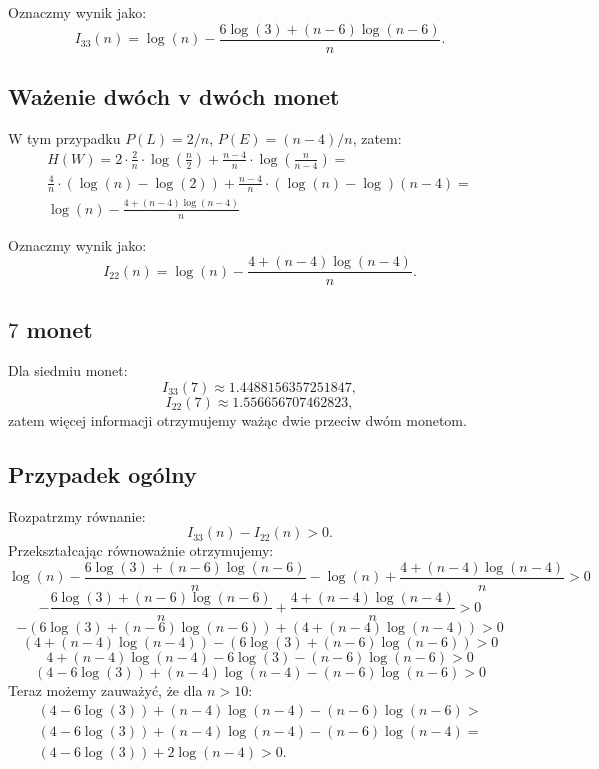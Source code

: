 Oznaczmy wynik jako:
$$
	I_{33}(n) = \log(n) - \frac{6\log(3) + (n-6)\log(n-6)}{n}.
$$

\subsection*{Ważenie dwóch v dwóch monet}

W tym przypadku $P(L) = 2/n$, $P(E) = (n-4)/n$, zatem:
\begin{align}
	H(W) = 2 \cdot \frac{2}{n} \cdot \log(\frac{n}{2}) + \frac{n-4}{n} \cdot \log(\frac{n}{n-4}) =\\
	\frac{4}{n} \cdot (\log(n) - \log(2)) + \frac{n-4}{n}\cdot(\log(n) - \log)(n-4) = \\
	\log(n) - \frac{4 + (n-4)\log(n-4)}{n}
\end{align}

Oznaczmy wynik jako:
$$
	I_{22}(n) = \log(n) - \frac{4 + (n-4)\log(n-4)}{n}.
$$

\subsection*{$7$ monet}
Dla siedmiu monet:
$$
	I_{33}(7) \approx 1.4488156357251847,
$$
$$
	I_{22}(7) \approx 1.556656707462823,
$$
zatem więcej informacji otrzymujemy ważąc dwie przeciw dwóm monetom.

\subsection*{Przypadek ogólny}
Rozpatrzmy równanie:
$$
	I_{33}(n) - I_{22}(n) > 0.
$$
Przekształcając równoważnie otrzymujemy:
$$
\log(n) - \frac{6\log(3) + (n-6)\log(n-6)}{n} - \log(n) + \frac{4 + (n-4)\log(n-4)}{n} > 0
$$
$$
 - \frac{6\log(3) + (n-6)\log(n-6)}{n} + \frac{4 + (n-4)\log(n-4)}{n} > 0
$$
$$
 -(6\log(3) + (n-6)\log(n-6)) + (4 + (n-4)\log(n-4)) > 0
$$
$$
(4 + (n-4)\log(n-4))-(6\log(3) + (n-6)\log(n-6)) > 0
$$
$$
4 + (n-4)\log(n-4) - 6\log(3) - (n-6)\log(n-6) > 0
$$
$$
(4 - 6\log(3)) + (n-4)\log(n-4) - (n-6)\log(n-6) > 0
$$
Teraz możemy zauważyć, że dla $n > 10$:
\begin{align*}
	(4 - 6\log(3)) + (n-4)\log(n-4) - (n-6)\log(n-6) > \\
	(4 - 6\log(3)) + (n-4)\log(n-4) - (n-6)\log(n-4) = \\
	(4 - 6\log(3)) + 2\log(n-4) > 0.
\end{align*}

